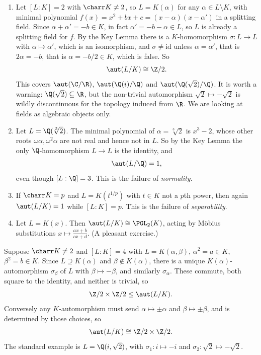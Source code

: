 \begin{example}\label{ex:autexamples}
	\begin{enumerate}[label=(\roman*)]
		\item Let $[L:K] = 2$ with $\charr K \neq 2$, so $L = K(\alpha)$ for any $\alpha \in L\setminus K$, with minimal polynomial $f(x) = x^2+bx+c = (x-\alpha)(x-\alpha')$ in a splitting field. Since $\alpha + \alpha' = -b \in K$, in fact $\alpha' = -b-\alpha \in L$, so $L$ is already a splitting field for $f$. By the Key Lemma there is a $K$-homomorphism $\sigma : L \to L$ with $\alpha \mapsto \alpha'$, which is an isomorphism, and $\sigma \neq \mathrm{id}$ unless $\alpha = \alpha'$, that is $2\alpha = -b$, that is $\alpha = -b/2 \in K$, which is false. So
		$$\aut(L/K) \cong \Z/2.$$
		This covers $\aut(\C/\R)$, $\aut(\Q(i)/\Q)$ and $\aut(\Q(\sqrt 2)/\Q)$. It is worth a warning: $\Q(\sqrt 2) \subseteq \R$, but the non-trivial automorphism $\sqrt 2 \mapsto -\sqrt 2$ is wildly discontinuous for the topology induced from $\R$. We are looking at fields as algebraic objects only.
		\item Let $L = \Q(\sqrt[3]2)$. The minimal polynomial of $\alpha = \sqrt[3]2$ is $x^3-2$, whose other roots $\omega\alpha, \omega^2\alpha$ are not real and hence not in $L$. So by the Key Lemma the only $\Q$-homomorphism $L \to L$ is the identity, and
		$$\aut(L/\Q) = 1,$$
		even though $[L:\Q] = 3$. This is the failure of \emph{normality}.
		\item If $\charr K = p$ and $L = K(t^{1/p})$ with $t \in K$ not a $p$th power, then again $\aut(L/K) = 1$ while $[L:K] = p$. This is the failure of \emph{separability}.
		\item Let $L = K(x)$. Then $\aut(L/K) \cong \PGL_2(K)$, acting by M\"obius substitutions $x \mapsto \frac{ax+b}{cx+d}$. (A pleasant exercise.)
	\end{enumerate}
\end{example}

\begin{example}\label{ex:biquad}
	Suppose $\charr K \neq 2$ and $[L:K] = 4$ with $L = K(\alpha,\beta)$, $\alpha^2 = a \in K$, $\beta^2 = b \in K$. Since $L \supseteq K(\alpha)$ and $\beta \notin K(\alpha)$, there is a unique $K(\alpha)$-automorphism $\sigma_\beta$ of $L$ with $\beta \mapsto -\beta$, and similarly $\sigma_\alpha$. These commute, both square to the identity, and neither is trivial, so
	$$\Z/2 \times \Z/2 \leq \aut(L/K).$$
	Conversely any $K$-automorphism must send $\alpha \mapsto \pm\alpha$ and $\beta \mapsto \pm\beta$, and is determined by those choices, so
	$$\aut(L/K) \cong \Z/2\times\Z/2.$$
	The standard example is $L = \Q(i,\sqrt 2)$, with $\sigma_1 : i \mapsto -i$ and $\sigma_2 : \sqrt 2 \mapsto -\sqrt 2$.
\end{example}

